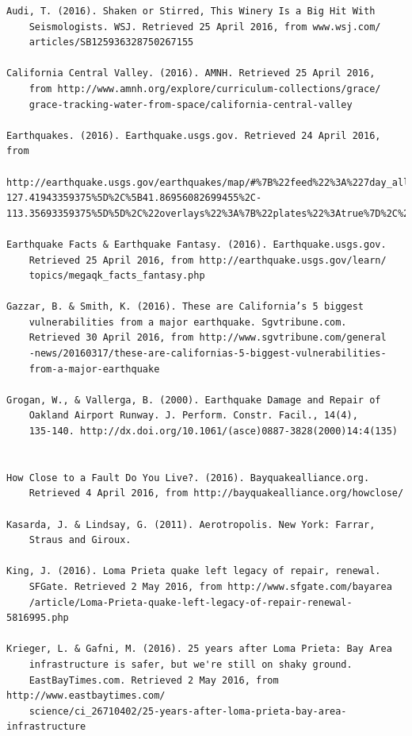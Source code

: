 \documentclass[12pt]{article}
\begin{document}
\begin{verbatim}
Audi, T. (2016). Shaken or Stirred, This Winery Is a Big Hit With 
    Seismologists. WSJ. Retrieved 25 April 2016, from www.wsj.com/
    articles/SB125936328750267155
    
California Central Valley. (2016). AMNH. Retrieved 25 April 2016, 
    from http://www.amnh.org/explore/curriculum-collections/grace/
    grace-tracking-water-from-space/california-central-valley

Earthquakes. (2016). Earthquake.usgs.gov. Retrieved 24 April 2016, from
    http://earthquake.usgs.gov/earthquakes/map/#%7B%22feed%22%3A%227day_all%22%2C%22search%22%3Anull%2C%22listFormat%22%3A%22default%22%2C%22sort%22%3A%22newest%22%2C%22basemap%22%3A%22grayscale%22%2C%22autoUpdate%22%3Atrue%2C%22restrictListToMap%22%3Atrue%2C%22timeZone%22%3A%22utc%22%2C%22mapposition%22%3A%5B%5B31.44741029142872%2C-127.41943359375%5D%2C%5B41.86956082699455%2C-113.35693359375%5D%5D%2C%22overlays%22%3A%7B%22plates%22%3Atrue%7D%2C%22viewModes%22%3A%7B%22map%22%3Atrue%2C%22list%22%3Atrue%2C%22settings%22%3Atrue%2C%22help%22%3Afalse%7D%7D

Earthquake Facts & Earthquake Fantasy. (2016). Earthquake.usgs.gov. 
    Retrieved 25 April 2016, from http://earthquake.usgs.gov/learn/
    topics/megaqk_facts_fantasy.php
    
Gazzar, B. & Smith, K. (2016). These are California’s 5 biggest 
    vulnerabilities from a major earthquake. Sgvtribune.com. 
    Retrieved 30 April 2016, from http://www.sgvtribune.com/general
    -news/20160317/these-are-californias-5-biggest-vulnerabilities-
    from-a-major-earthquake
    
Grogan, W., & Vallerga, B. (2000). Earthquake Damage and Repair of 
    Oakland Airport Runway. J. Perform. Constr. Facil., 14(4), 
    135-140. http://dx.doi.org/10.1061/(asce)0887-3828(2000)14:4(135)

    
How Close to a Fault Do You Live?. (2016). Bayquakealliance.org. 
    Retrieved 4 April 2016, from http://bayquakealliance.org/howclose/
    
Kasarda, J. & Lindsay, G. (2011). Aerotropolis. New York: Farrar, 
    Straus and Giroux.

King, J. (2016). Loma Prieta quake left legacy of repair, renewal. 
    SFGate. Retrieved 2 May 2016, from http://www.sfgate.com/bayarea
    /article/Loma-Prieta-quake-left-legacy-of-repair-renewal-5816995.php

Krieger, L. & Gafni, M. (2016). 25 years after Loma Prieta: Bay Area 
    infrastructure is safer, but we're still on shaky ground. 
    EastBayTimes.com. Retrieved 2 May 2016, from http://www.eastbaytimes.com/
    science/ci_26710402/25-years-after-loma-prieta-bay-area-infrastructure
    

\end{verbatim}
\end{document}
